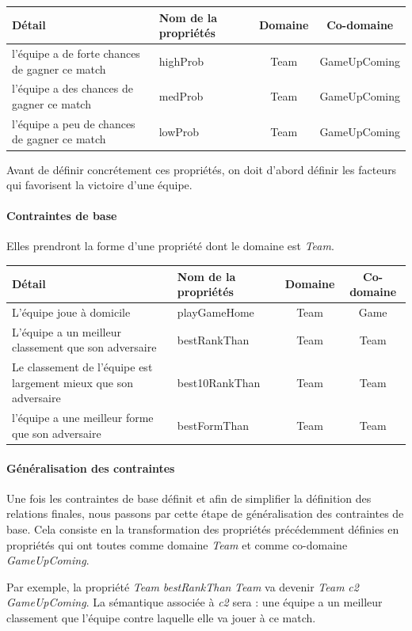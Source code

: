 \documentclass[oneside,13pt,a4paper]{article}
\begin{document}
\begin{tabular}{| p{5cm} | l | c | c |}
  \hline
  Détail & Nom de la propriétés & Domaine & Co-domaine\\ \hline
  l'équipe a de forte chances de gagner ce match & highProb & Team & GameUpComing  \\ \hline
  l'équipe a des chances de gagner ce match & medProb & Team & GameUpComing  \\ \hline
  l'équipe a peu de chances de gagner ce match & lowProb & Team & GameUpComing  \\
  \hline
\end{tabular}

Avant de définir concrétement ces propriétés, on doit d'abord définir les facteurs qui favorisent la victoire d'une équipe.

\paragraph{Contraintes de base}

Elles prendront la forme d’une propriété dont le domaine est \textit{Team}.

\begin{tabular}{| p{5cm} | l | c | c |}
  \hline
  Détail & Nom de la propriétés & Domaine & Co-domaine\\ \hline
  L'équipe joue à domicile & playGameHome & Team & Game  \\ \hline
  L'équipe a un meilleur classement que son adversaire & bestRankThan & Team & Team  \\ \hline
  Le classement de l'équipe est largement mieux que son adversaire & best10RankThan & Team & Team \\ \hline
  l'équipe a une meilleur forme que son adversaire & bestFormThan & Team & Team  \\
  \hline
\end{tabular}

\paragraph{Généralisation des contraintes} Une fois les contraintes de base définit et afin de simplifier la définition des relations finales, nous passons par cette étape de généralisation des contraintes de base. Cela consiste en la transformation des propriétés précédemment définies en propriétés qui ont toutes comme domaine \textit{Team} et comme co-domaine \textit{GameUpComing}.

Par exemple, la propriété \textit{Team} \textit{bestRankThan} \textit{Team} va devenir \textit{Team} \textit{c2} \textit{GameUpComing}. La sémantique associée à \textit{c2} sera : \guillemotleft une équipe a un meilleur classement que l'équipe contre laquelle elle va jouer à ce match.\guillemotright
\end{document}

